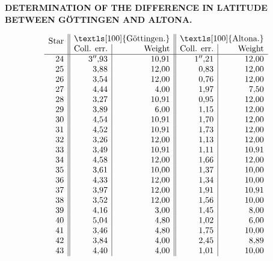 \begingroup
\setlength{\abovedisplayskip}{7pt}
\setlength{\belowdisplayskip}{7pt}
\setlength{\abovedisplayshortskip}{3pt}
\setlength{\belowdisplayshortskip}{4pt}
\def\ixrad{\mathord{\vcenter{\hbox{\Large\(\surd\)}}}}
\def\ixangle#1#2#3{%
  \makebox[1.95em][r]{\(#1\)}%
  \makebox[1.45em][r]{\(#2\)}%
  \makebox[3.10em][r]{\(#3\)}}
\def\ixobsCount#1#2{\makebox[.8em][r]{#1}\enspace\makebox[2.6em][c]{#2}}
\def\ixobs#1#2#3#4#5#6#7#8#9{%
  #1 & \(\left\{\begin{array}{@{}l@{\enspace}l@{}}
  \text{Direct}&\ixangle{#2}{#3}{#4}\\
  \text{Reflected}&\ixangle{#5}{#6}{#7}
  \end{array}\right.\) &
  \begin{tabular}{@{}l@{}}#8\\#9\end{tabular}}

\par\clearpage
\noindent{}\parbox[t]{\dimexpr\linewidth-24mm\relax}{\centering\scriptsize\bfseries DETERMINATION OF THE DIFFERENCE IN LATITUDE BETWEEN GÖTTINGEN AND ALTONA.}\makebox[12mm][r]{}\par\medskip

{\small
\setlength{\arraycolsep}{.85em}
\[
\begin{array}{r||r|r||r|r}
\smash{\raisebox{-.7ex}{Star}}&
\multicolumn{2}{c||}{\text{\normalsize\textls[100]{Göttingen.}}}&
\multicolumn{2}{c}{\text{\normalsize\textls[100]{Altona.}}}\\
&\text{Coll. err.}&\text{Weight}&\text{Coll. err.}&\text{Weight}\\
\hline
24&3''{,}93&10{,}91&1''{,}21&12{,}00\\
25&3{,}88&12{,}00&0{,}83&12{,}00\\
26&3{,}54&12{,}00&0{,}76&12{,}00\\
27&4{,}44&4{,}00&1{,}97&7{,}50\\
28&3{,}27&10{,}91&0{,}95&12{,}00\\
29&3{,}89&6{,}00&1{,}15&12{,}00\\
30&4{,}54&10{,}91&1{,}70&12{,}00\\
31&4{,}52&10{,}91&1{,}73&12{,}00\\
32&3{,}26&12{,}00&1{,}13&12{,}00\\
33&3{,}49&10{,}91&1{,}11&10{,}91\\
34&4{,}58&12{,}00&1{,}66&12{,}00\\
35&3{,}61&10{,}00&1{,}37&10{,}00\\
36&4{,}33&12{,}00&1{,}34&10{,}00\\
37&3{,}97&12{,}00&1{,}91&10{,}91\\
38&3{,}52&12{,}00&1{,}56&10{,}00\\
39&4{,}16&3{,}00&1{,}45&8{,}00\\
40&5{,}04&4{,}80&1{,}02&6{,}00\\
41&3{,}46&4{,}80&1{,}75&10{,}00\\
42&3{,}84&4{,}00&2{,}45&8{,}89\\
43&4{,}40&4{,}00&1{,}01&10{,}00
\end{array}
\]
\par
}

